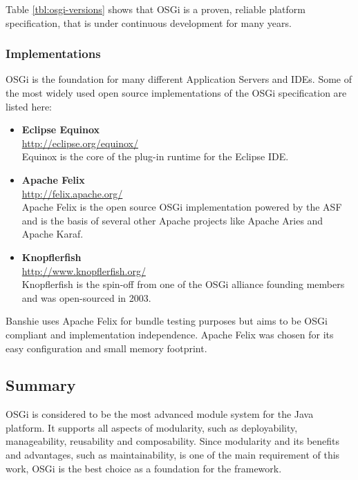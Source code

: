 Table \ref{tbl:osgi-versions} shows that OSGi is a proven, reliable platform specification, that is under continuous development for many years.

\subsubsection{Implementations}
\gls{OSGi} is the foundation for many different Application Servers and IDEs. Some of the most widely used open source implementations of the \gls{OSGi} specification are listed here: 

\begin{itemize}
	\item \textbf{Eclipse Equinox} \\
		\url{http://eclipse.org/equinox/} \\
		Equinox is the core of the plug-in runtime for the Eclipse IDE.
	\item \textbf{Apache Felix} \\
		\url{http://felix.apache.org/} \\
		Apache Felix is the open source \gls{OSGi} implementation powered by the \gls{ASF} and is the basis of several other Apache projects like Apache Aries and Apache Karaf.
	\item \textbf{Knopflerfish} \\
		\url{http://www.knopflerfish.org/} \\
		Knopflerfish is the spin-off from one of the \gls{OSGi} alliance founding members and was open-sourced in 2003.
\end{itemize}

Banshie uses Apache Felix for bundle testing purposes but aims to be \gls{OSGi} compliant and implementation independence. Apache Felix was chosen for its easy configuration and small memory footprint.

\subsection{Summary}
\gls{OSGi} is considered to be the most advanced module system for the Java platform. It supports all aspects of modularity, such as deployability, manageability, reusability and composability. Since modularity and its benefits and advantages, such as maintainability, is one of the main requirement of this work, \gls{OSGi} is the best choice as a foundation for the framework.